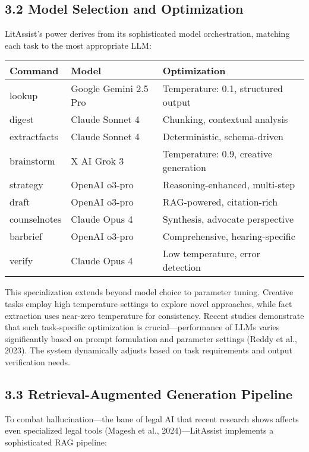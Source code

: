 \documentclass[12pt,a4paper]{article}
\begin{document}
\subsection*{3.2 Model Selection and Optimization}

LitAssist's power derives from its sophisticated model orchestration, matching each task to the most appropriate LLM:

\begin{center}
\begin{tabular}{|l|l|l|}
\hline
\textbf{Command} & \textbf{Model} & \textbf{Optimization} \\
\hline
lookup & Google Gemini 2.5 Pro & Temperature: 0.1, structured output \\
digest & Claude Sonnet 4 & Chunking, contextual analysis \\
extractfacts & Claude Sonnet 4 & Deterministic, schema-driven \\
brainstorm & X AI Grok 3 & Temperature: 0.9, creative generation \\
strategy & OpenAI o3-pro & Reasoning-enhanced, multi-step \\
draft & OpenAI o3-pro & RAG-powered, citation-rich \\
counselnotes & Claude Opus 4 & Synthesis, advocate perspective \\
barbrief & OpenAI o3-pro & Comprehensive, hearing-specific \\
verify & Claude Opus 4 & Low temperature, error detection \\
\hline
\end{tabular}
\end{center}

This specialization extends beyond model choice to parameter tuning. Creative tasks employ high temperature settings to explore novel approaches, while fact extraction uses near-zero temperature for consistency. Recent studies demonstrate that such task-specific optimization is crucial—performance of LLMs varies significantly based on prompt formulation and parameter settings (Reddy et al., 2023). The system dynamically adjusts based on task requirements and output verification needs.

\subsection*{3.3 Retrieval-Augmented Generation Pipeline}

To combat hallucination—the bane of legal AI that recent research shows affects even specialized legal tools (Magesh et al., 2024)—LitAssist implements a sophisticated RAG pipeline:
\end{document}
